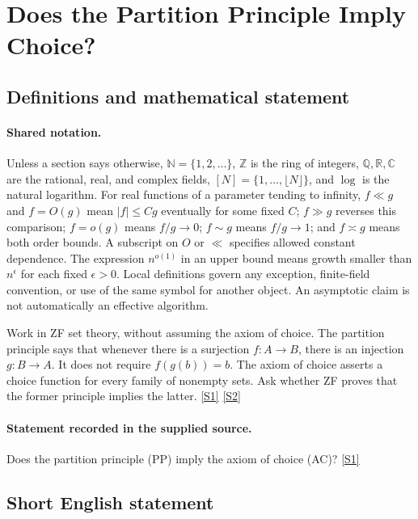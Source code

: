 \documentclass[11pt,a4paper]{article}
\newcommand{\N}{\mathbb{N}}
\newcommand{\Z}{\mathbb{Z}}
\newcommand{\Q}{\mathbb{Q}}
\newcommand{\R}{\mathbb{R}}
\newcommand{\C}{\mathbb{C}}
\newcommand{\sref}[2]{\hyperlink{source:#1:#2}{[S#2]}}
\begin{document}
\section{Does the Partition Principle Imply Choice?}\label{statement}


\subsection{Definitions and mathematical statement}

\paragraph{Shared notation.}Unless a section says otherwise, $\N=\{1,2,\ldots\}$,
$\Z$ is the ring of integers, $\Q,\R,\C$ are the rational, real, and complex
fields, $[N]=\{1,\ldots,\lfloor N\rfloor\}$, and $\log$ is the natural
logarithm. For real functions of a parameter tending to infinity,
$f\ll g$ and $f=O(g)$ mean $|f|\leq Cg$ eventually for some fixed $C$;
$f\gg g$ reverses this comparison; $f=o(g)$ means $f/g\to0$;
$f\sim g$ means $f/g\to1$; and $f\asymp g$ means both order bounds.
A subscript on $O$ or $\ll$ specifies allowed constant dependence.
The expression $n^{o(1)}$ in an upper bound means growth smaller than
$n^\epsilon$ for each fixed $\epsilon>0$. Local definitions govern any
exception, finite-field convention, or use of the same symbol for another
object. An asymptotic claim is not automatically an effective algorithm.



Work in ZF set theory, without assuming the axiom of choice. The partition principle says that whenever there is a surjection $f:A\to B$, there is an injection $g:B\to A$. It does not require $f(g(b))=b$. The axiom of choice asserts a choice function for every family of nonempty sets. Ask whether ZF proves that the former principle implies the latter. \sref{statement}{1} \sref{statement}{2}

\paragraph{Statement recorded in the supplied source.}
Does the partition principle (PP) imply the axiom of choice (AC)? \sref{statement}{1}

\subsection{Short English statement}
\end{document}
